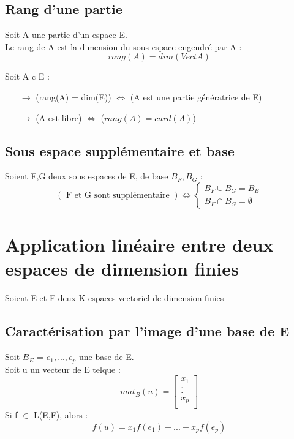 \subsection{Rang d'une partie}
\begin{de}
Soit A une partie d'un espace E.\\
Le rang de A est la dimension du sous espace engendré par A :
$$rang(A) = dim(Vect{A})$$
\end{de}
\begin{prop}
Soit A c E : 
\begin{itemize}
 \item[$\rightarrow$] (rang(A) = dim(E)) $\Leftrightarrow$ (A est une partie génératrice de E)
 \item[$\rightarrow$] (A est libre) $\Leftrightarrow$ ($rang(A) = card(A)$)
\end{itemize}
\end{prop}
\subsection{Sous espace supplémentaire et base}
Soient F,G deux sous espaces de E, de base $B_F,B_G$ :
$$( \mbox{ F et G sont supplémentaire }) \Leftrightarrow \left\{\begin{array}{l}
  B_F \cup B_G = B_E \\
   B_F \cap B_G = \emptyset
  \end{array}\right.$$
\section{Application linéaire entre deux espaces de dimension finies}
Soient E et F deux K-espaces vectoriel de dimension finies
\subsection{Caractérisation par l'image d'une base de E}
Soit $B_E$ = {$e_1,...,e_p$} une base de E.\\
Soit u un vecteur de E telque :$$mat_B(u) = \begin{bmatrix}
 x_1 \\
  . \\
  . \\
 x_p \\
\end{bmatrix}$$
Si f $\in$ L(E,F), alors :
$$f(u) = x_1f(e_1)+...+x_pf(e_p)$$
